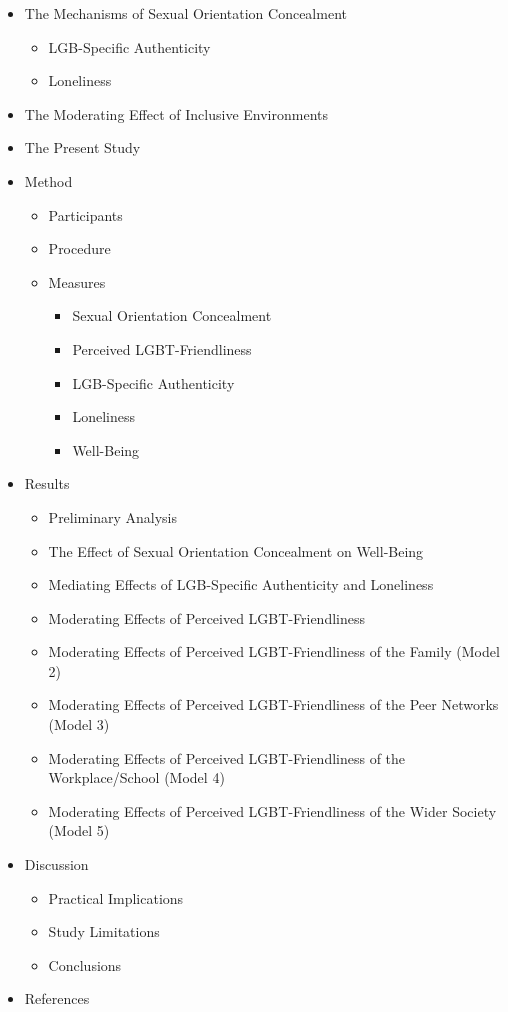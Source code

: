 \documentclass[
  11pt,
]{book}
\providecommand{\tightlist}{%
  \setlength{\itemsep}{0pt}\setlength{\parskip}{0pt}}
\begin{document}
\begin{itemize}
\tightlist
\item
  The Mechanisms of Sexual Orientation Concealment

  \begin{itemize}
  \tightlist
  \item
    LGB-Specific Authenticity
  \item
    Loneliness
  \end{itemize}
\item
  The Moderating Effect of Inclusive Environments
\item
  The Present Study
\item
  Method

  \begin{itemize}
  \tightlist
  \item
    Participants
  \item
    Procedure
  \item
    Measures

    \begin{itemize}
    \tightlist
    \item
      Sexual Orientation Concealment
    \item
      Perceived LGBT-Friendliness
    \item
      LGB-Specific Authenticity
    \item
      Loneliness
    \item
      Well-Being
    \end{itemize}
  \end{itemize}
\item
  Results

  \begin{itemize}
  \tightlist
  \item
    Preliminary Analysis
  \item
    The Effect of Sexual Orientation Concealment on Well-Being
  \item
    Mediating Effects of LGB-Specific Authenticity and Loneliness
  \item
    Moderating Effects of Perceived LGBT-Friendliness
  \item
    Moderating Effects of Perceived LGBT-Friendliness of the Family (Model 2)
  \item
    Moderating Effects of Perceived LGBT-Friendliness of the Peer Networks (Model 3)
  \item
    Moderating Effects of Perceived LGBT-Friendliness of the Workplace/School (Model 4)
  \item
    Moderating Effects of Perceived LGBT-Friendliness of the Wider Society (Model 5)
  \end{itemize}
\item
  Discussion

  \begin{itemize}
  \tightlist
  \item
    Practical Implications
  \item
    Study Limitations
  \item
    Conclusions
  \end{itemize}
\item
  References
\end{itemize}
\end{document}

